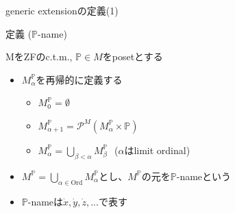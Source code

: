 \documentclass[17pt,aspectratio=169]{beamer}
\newcommand{\Pbb}{\mathbb{P}}
\begin{document}

\begin{frame}{generic extensionの定義(1)}
    \vspace{-5pt}
    \begin{itembox}[l]{定義 ($\Pbb$-name)}
        {\small
            \vspace{-5pt}
            MをZFのc.t.m., $\Pbb \in M$をposetとする
            \vspace{-8pt}
            \begin{itemize}[itemsep=1pt] 
                \item $M^{\Pbb}_{\alpha}$を再帰的に定義する 
                    \begin{itemize}
                       \item $M^{\Pbb}_0 = \emptyset$ 
                       \item  $M^{\Pbb}_{\alpha+1} = \mathcal{P}^M(M^{\Pbb}_{\alpha} \times \Pbb)$ 
                       \item  $M^{\Pbb}_{\alpha} = \bigcup_{\beta < \alpha} M^{\Pbb}_{\beta}$\,\,\,\,($\alpha$はlimit ordinal)
                    \end{itemize}
                \item $M^{\Pbb} = \bigcup_{\alpha \in \text{Ord}} M^{\Pbb}_{\alpha}$とし、$M^{\Pbb}$の元を$\Pbb$-nameという
                \item $\Pbb$-nameは$\dot{x}, \dot{y}, \dot{z}, ...$で表す
            \end{itemize}            
        }
    \end{itembox}
\end{frame}
\end{document}
